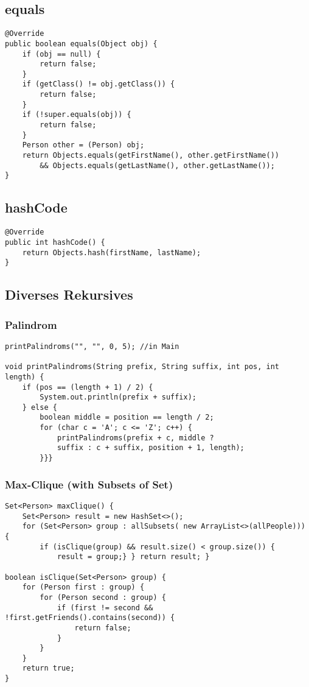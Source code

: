 \begin{multicols*}{5}
	\subsection{equals}
		
		\begin{lstlisting}
@Override
public boolean equals(Object obj) {
	if (obj == null) {
		return false;
	}
	if (getClass() != obj.getClass()) {
		return false;
	}
	if (!super.equals(obj)) {
		return false;
	}
	Person other = (Person) obj;
	return Objects.equals(getFirstName(), other.getFirstName()) 
		&& Objects.equals(getLastName(), other.getLastName());
}
		\end{lstlisting}
	
	\subsection{hashCode}
		\begin{lstlisting}
@Override
public int hashCode() {
	return Objects.hash(firstName, lastName);
}
		\end{lstlisting}	
	\subsection{Diverses Rekursives}
	\subsubsection{Palindrom}
	\begin{lstlisting}
printPalindroms("", "", 0, 5); //in Main

void printPalindroms(String prefix, String suffix, int pos, int length) {
	if (pos == (length + 1) / 2) {
		System.out.println(prefix + suffix);
	} else {
		boolean middle = position == length / 2;
		for (char c = 'A'; c <= 'Z'; c++) {
			printPalindroms(prefix + c, middle ? 
			suffix : c + suffix, position + 1, length);
		}}}
	\end{lstlisting}
	\subsubsection{Max-Clique (with Subsets of Set)}
\begin{lstlisting}
Set<Person> maxClique() {
	Set<Person> result = new HashSet<>();
	for (Set<Person> group : allSubsets( new ArrayList<>(allPeople))) {
		if (isClique(group) && result.size() < group.size()) {
			result = group;} } return result; }

boolean isClique(Set<Person> group) { 
	for (Person first : group) {
		for (Person second : group) {
			if (first != second && !first.getFriends().contains(second)) {
				return false; 
			} 
		} 
	} 
	return true; 
}


\end{lstlisting}
\end{multicols*}
